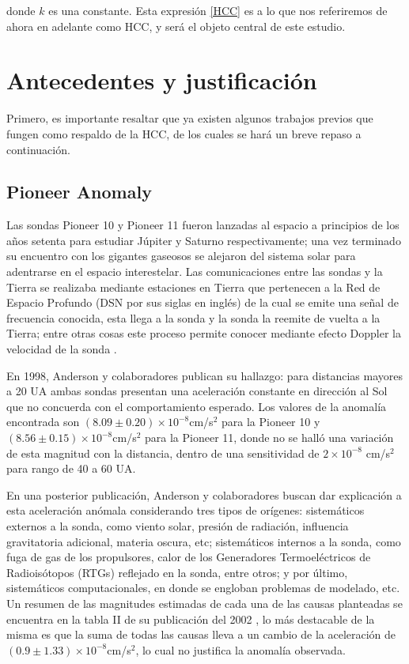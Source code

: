 donde $k$ es una constante. Esta expresión \eqref{HCC} es a lo que nos referiremos de ahora en adelante como \ac{HCC}, y será el objeto central de este estudio.

\section{Antecedentes y justificación}
Primero, es importante resaltar que ya existen algunos trabajos previos que fungen como respaldo de la \ac{HCC}, de los cuales se hará un breve repaso a continuación.
\subsection{Pioneer Anomaly}
Las sondas Pioneer 10 y Pioneer 11 fueron lanzadas al espacio a principios de los años setenta para estudiar Júpiter y Saturno respectivamente; una vez terminado su encuentro con los gigantes gaseosos se alejaron del sistema solar para adentrarse en el espacio interestelar. Las comunicaciones entre las sondas y la Tierra se realizaba mediante estaciones en Tierra que pertenecen a la Red de Espacio Profundo (DSN por sus siglas en inglés) de la cual se emite una señal de frecuencia conocida, esta llega a la sonda y la sonda la reemite de vuelta a la Tierra; entre otras cosas este proceso permite conocer mediante efecto Doppler la velocidad de la sonda \cite{anderson2002}.

En 1998, Anderson y colaboradores \cite{anderson1998}
publican su hallazgo: para distancias mayores a 20 UA ambas sondas presentan una aceleración constante en dirección al Sol que no concuerda con el comportamiento esperado. Los valores de la anomalía encontrada son $(8.09 \pm 0.20) \times 10^{-8}$cm/s$^2$ para la Pioneer 10 y $(8.56 \pm 0.15) \times 10^{-8}$cm/s$^2$ para la Pioneer 11, donde no se halló una variación de esta magnitud con la distancia, dentro de una sensitividad de $2 \times 10 ^{-8}$ cm/s$^{2}$ para rango de 40 a 60 UA.

En una posterior publicación, Anderson y colaboradores \cite{anderson2002} buscan dar explicación a esta aceleración anómala considerando tres tipos de orígenes: sistemáticos externos a la sonda, como viento solar, presión de radiación, influencia gravitatoria adicional, materia oscura, etc; sistemáticos internos a la sonda, como fuga de gas de los propulsores, calor de los  Generadores Termoeléctricos de Radioisótopos (RTGs) reflejado en la sonda, entre otros; y por último, sistemáticos computacionales, en donde se engloban problemas de modelado, etc. Un resumen de las magnitudes estimadas de cada una de las causas planteadas se encuentra en la tabla II de su publicación del 2002 \cite{anderson2002}, lo más destacable de la misma es que la suma de todas las causas lleva a un cambio de la aceleración de $(0.9 \pm 1.33) \times 10^{-8}$cm/s$^2$, lo cual no justifica la anomalía observada.

